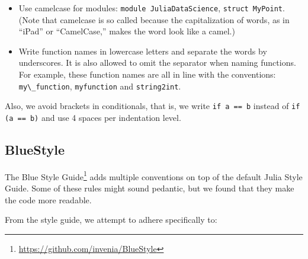 \documentclass[
  notoc %
]{tufte-book}
\DeclareRobustCommand{\href}[2]{#2\footnote{\url{#1}}}
\providecommand{\tightlist}{%
  \setlength{\itemsep}{0pt}\setlength{\parskip}{0pt}
}
\newcommand{\passthrough}[1]{#1}
\begin{document}
\begin{itemize}
\tightlist
\item
  Use camelcase for modules:
  \passthrough{\lstinline!module JuliaDataScience!},
  \passthrough{\lstinline!struct MyPoint!}. (Note that camelcase is so
  called because the capitalization of words, as in ``iPad'' or
  ``CamelCase,'' makes the word look like a camel.)
\item
  Write function names in lowercase letters and separate the words by
  underscores. It is also allowed to omit the separator when naming
  functions. For example, these function names are all in line with the
  conventions: \passthrough{\lstinline!my\_function!},
  \passthrough{\lstinline!myfunction!} and
  \passthrough{\lstinline!string2int!}.
\end{itemize}

Also, we avoid brackets in conditionals, that is, we write
\passthrough{\lstinline!if a == b!} instead of
\passthrough{\lstinline!if (a == b)!} and use 4 spaces per indentation
level.

\hypertarget{bluestyle}{%
\subsection{BlueStyle}\label{bluestyle}}

The \href{https://github.com/invenia/BlueStyle}{Blue Style Guide} adds
multiple conventions on top of the default Julia Style Guide. Some of
these rules might sound pedantic, but we found that they make the code
more readable.

From the style guide, we attempt to adhere specifically to:
\end{document}

